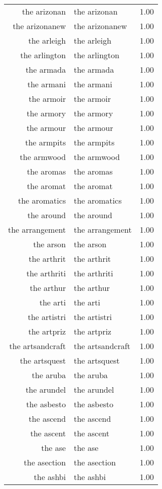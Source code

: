 \begin{table}[ht]
\begin{tabular}{rlr}
  the arizonan & the arizonan & 1.00 \\ 
  the arizonanew & the arizonanew & 1.00 \\ 
  the arleigh & the arleigh & 1.00 \\ 
  the arlington & the arlington & 1.00 \\ 
  the armada & the armada & 1.00 \\ 
  the armani & the armani & 1.00 \\ 
  the armoir & the armoir & 1.00 \\ 
  the armory & the armory & 1.00 \\ 
  the armour & the armour & 1.00 \\ 
  the armpits & the armpits & 1.00 \\ 
  the armwood & the armwood & 1.00 \\ 
  the aromas & the aromas & 1.00 \\ 
  the aromat & the aromat & 1.00 \\ 
  the aromatics & the aromatics & 1.00 \\ 
  the around & the around & 1.00 \\ 
  the arrangement & the arrangement & 1.00 \\ 
  the arson & the arson & 1.00 \\ 
  the arthrit & the arthrit & 1.00 \\ 
  the arthriti & the arthriti & 1.00 \\ 
  the arthur & the arthur & 1.00 \\ 
  the arti & the arti & 1.00 \\ 
  the artistri & the artistri & 1.00 \\ 
  the artpriz & the artpriz & 1.00 \\ 
  the artsandcraft & the artsandcraft & 1.00 \\ 
  the artsquest & the artsquest & 1.00 \\ 
  the aruba & the aruba & 1.00 \\ 
  the arundel & the arundel & 1.00 \\ 
  the asbesto & the asbesto & 1.00 \\ 
  the ascend & the ascend & 1.00 \\ 
  the ascent & the ascent & 1.00 \\ 
  the ase & the ase & 1.00 \\ 
  the asection & the asection & 1.00 \\ 
  the ashbi & the ashbi & 1.00 \\ 

\end{tabular}
\end{table}
